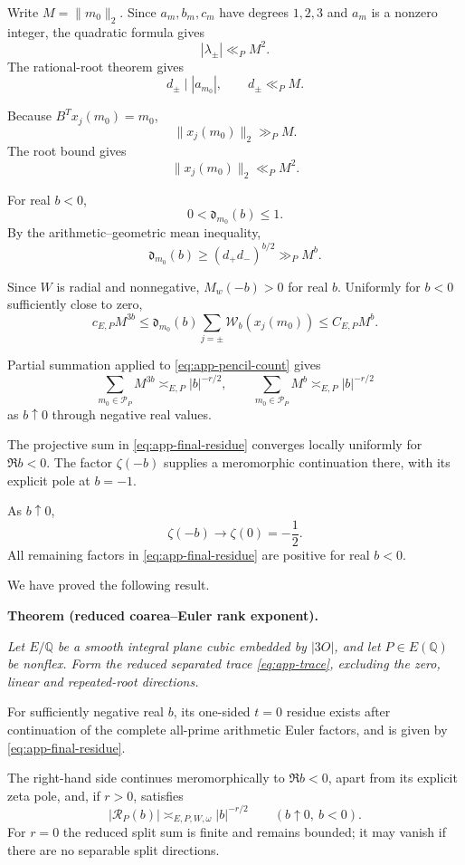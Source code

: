 \documentclass[11pt]{article}
\begin{document}
Write $M=\|m_0\|_2$.
Since $a_m,b_m,c_m$ have degrees
$1,2,3$ and $a_m$ is a nonzero integer,
the quadratic formula gives
\[
|\lambda_\pm|\ll_P M^2.
\]
The rational-root theorem gives
\[
d_\pm\mid |a_{m_0}|,
\qquad d_\pm\ll_P M.
\]

Because $B^Tx_j(m_0)=m_0$,
\[
\|x_j(m_0)\|_2\gg_P M.
\]
The root bound gives
\[
\|x_j(m_0)\|_2\ll_P M^2.
\]

For real $b<0$,
\[
0<\mathfrak d_{m_0}(b)\le1.
\]
By the arithmetic--geometric mean
inequality,
\[
\mathfrak d_{m_0}(b)
\ge(d_+d_-)^{b/2}
\gg_P M^b.
\]

Since $W$ is radial and nonnegative,
$M_w(-b)>0$ for real $b$.
Uniformly for $b<0$ sufficiently close
to zero,
\[
c_{E,P}M^{3b}
\le
\mathfrak d_{m_0}(b)
\sum_{j=\pm}\mathcal W_b(x_j(m_0))
\le
C_{E,P}M^b.
\]

Partial summation applied to
\eqref{eq:app-pencil-count} gives
\[
\sum_{m_0\in\mathcal P_P}M^{3b}
\asymp_{E,P}|b|^{-r/2},
\qquad
\sum_{m_0\in\mathcal P_P}M^b
\asymp_{E,P}|b|^{-r/2}
\]
as $b\uparrow0$ through negative
real values.

The projective sum in
\eqref{eq:app-final-residue} converges
locally uniformly for $\Re b<0$.
The factor $\zeta(-b)$ supplies a
meromorphic continuation there,
with its explicit pole at $b=-1$.

As $b\uparrow0$,
\[
\zeta(-b)\longrightarrow
\zeta(0)=-\frac12.
\]
All remaining factors in
\eqref{eq:app-final-residue} are
positive for real $b<0$.

We have proved the following result.

\medskip
\noindent\textbf{Theorem (reduced coarea--Euler rank exponent).}
{\itshape
Let $E/\mathbb Q$ be a smooth integral
plane cubic embedded by $|3O|$, and
let $P\in E(\mathbb Q)$ be nonflex.
Form the reduced separated trace
\eqref{eq:app-trace}, excluding the
zero, linear and repeated-root
directions.

For sufficiently negative real $b$,
its one-sided $t=0$ residue exists
after continuation of the complete
all-prime arithmetic Euler factors,
and is given by
\eqref{eq:app-final-residue}.

The right-hand side continues
meromorphically to $\Re b<0$,
apart from its explicit zeta pole,
and, if $r>0$, satisfies
\[
\boxed{
|\mathcal R_P(b)|
\asymp_{E,P,W,\omega}
|b|^{-r/2}
\qquad(b\uparrow0,\ b<0).
}
\]
For $r=0$ the reduced split sum is
finite and remains bounded; it may
vanish if there are no separable
split directions.
}

\medskip
\end{document}
